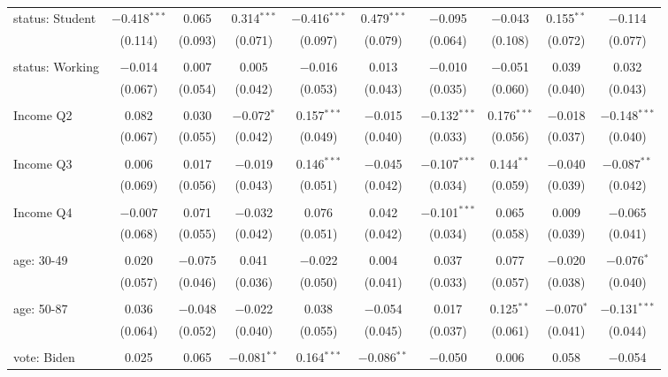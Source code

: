 \begin{tabular}{@{\extracolsep{5pt}}lccccccccc}
 status: Student & $-$0.418$^{***}$ & 0.065 & 0.314$^{***}$ & $-$0.416$^{***}$ & 0.479$^{***}$ & $-$0.095 & $-$0.043 & 0.155$^{**}$ & $-$0.114 \\ 
  & (0.114) & (0.093) & (0.071) & (0.097) & (0.079) & (0.064) & (0.108) & (0.072) & (0.077) \\ 
  & & & & & & & & & \\ 
 status: Working & $-$0.014 & 0.007 & 0.005 & $-$0.016 & 0.013 & $-$0.010 & $-$0.051 & 0.039 & 0.032 \\ 
  & (0.067) & (0.054) & (0.042) & (0.053) & (0.043) & (0.035) & (0.060) & (0.040) & (0.043) \\ 
  & & & & & & & & & \\ 
 Income Q2 & 0.082 & 0.030 & $-$0.072$^{*}$ & 0.157$^{***}$ & $-$0.015 & $-$0.132$^{***}$ & 0.176$^{***}$ & $-$0.018 & $-$0.148$^{***}$ \\ 
  & (0.067) & (0.055) & (0.042) & (0.049) & (0.040) & (0.033) & (0.056) & (0.037) & (0.040) \\ 
  & & & & & & & & & \\ 
 Income Q3 & 0.006 & 0.017 & $-$0.019 & 0.146$^{***}$ & $-$0.045 & $-$0.107$^{***}$ & 0.144$^{**}$ & $-$0.040 & $-$0.087$^{**}$ \\ 
  & (0.069) & (0.056) & (0.043) & (0.051) & (0.042) & (0.034) & (0.059) & (0.039) & (0.042) \\ 
  & & & & & & & & & \\ 
 Income Q4 & $-$0.007 & 0.071 & $-$0.032 & 0.076 & 0.042 & $-$0.101$^{***}$ & 0.065 & 0.009 & $-$0.065 \\ 
  & (0.068) & (0.055) & (0.042) & (0.051) & (0.042) & (0.034) & (0.058) & (0.039) & (0.041) \\ 
  & & & & & & & & & \\ 
 age: 30-49 & 0.020 & $-$0.075 & 0.041 & $-$0.022 & 0.004 & 0.037 & 0.077 & $-$0.020 & $-$0.076$^{*}$ \\ 
  & (0.057) & (0.046) & (0.036) & (0.050) & (0.041) & (0.033) & (0.057) & (0.038) & (0.040) \\ 
  & & & & & & & & & \\ 
 age: 50-87 & 0.036 & $-$0.048 & $-$0.022 & 0.038 & $-$0.054 & 0.017 & 0.125$^{**}$ & $-$0.070$^{*}$ & $-$0.131$^{***}$ \\ 
  & (0.064) & (0.052) & (0.040) & (0.055) & (0.045) & (0.037) & (0.061) & (0.041) & (0.044) \\ 
  & & & & & & & & & \\ 
 vote: Biden & 0.025 & 0.065 & $-$0.081$^{**}$ & 0.164$^{***}$ & $-$0.086$^{**}$ & $-$0.050 & 0.006 & 0.058 & $-$0.054 \\ 

\end{tabular}
